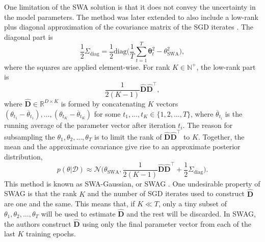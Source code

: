 \documentclass[msc,deptreport.inf]{infthesis} %
\newcommand{\matr}[1]{\mathbf{#1}}
\newcommand{\bgreek}[1]{\boldsymbol{#1}}
\newcommand{\R}{\mathbb R}
\newcommand{\N}{\mathbb N}
\begin{document}
One limitation of the SWA solution is that it does not convey the uncertainty in the model parameters. The method was later extended to also include a low-rank plus diagonal approximation of the covariance matrix of the SGD iterates \cite{maddox2019}. The diagonal part is
\begin{equation}
	\frac{1}{2}\Sigma_\text{diag} = \frac{1}{2} \text{diag}\Bigg(\frac{1}{T}\sum_{t=1}^T \bgreek{\theta}_t^2 - \theta_{\text{SWA}}^2 \Bigg),
\end{equation}
where the squares are applied element-wise. For rank $K \in \N^+$, the low-rank part is
\begin{equation}
	\frac{1}{2(K-1)} \hat{\matr{D}}\hat{\matr{D}}^\intercal,
\end{equation}
where $\hat{\matr{D}} \in \R^{D \times K}$ is formed by concatenating $K$ vectors $(\theta_{t_1} - \overline{\theta}_{t_1}), \dots, (\theta_{t_K} - \overline{\theta}_{t_K})$ for some $t_1, \dots, t_K \in \{1,2, \dots, T\}$, where $\overline{\theta}_{t_i}$ is the running average of the parameter vector after iteration $t_i$. The reason for subsampling the $\theta_1, \theta_2, \dots, \theta_T$ is to limit the rank of $\hat{\matr{D}}\hat{\matr{D}}^\intercal$ to $K$. 
Together, the mean and the approximate covariance give rise to an approximate posterior distribution, 
\begin{equation}\label{eqn:swag_dist}
	p(\theta | \mathcal{D}) \approx 
	\mathcal{N}\Big(\theta_\text{SWA}, \frac{1}{2(K-1)} \hat{\matr{D}}\hat{\matr{D}}^\intercal + \frac{1}{2}\Sigma_\text{diag}\Big).
\end{equation}
This method is known as SWA-Gaussian, or SWAG \cite{maddox2019}. One undesirable property of SWAG is that the rank $K$ and the number of SGD iterates used to construct $\hat{\matr{D}}$ are one and the same. This means that, if $K \ll T$, only a tiny subset of $\theta_1, \theta_2, \dots, \theta_T$ will be used to estimate $\hat{\matr{D}}$ and the rest will be discarded. In SWAG, the authors construct $\hat{\matr{D}}$ using only the final parameter vector from each of the last $K$ training epochs. 
\end{document}
